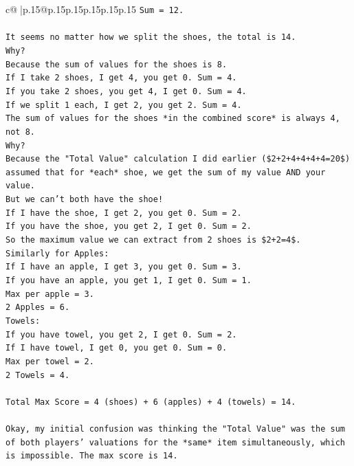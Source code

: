 \documentclass{article}
\begin{document}
{\begin{supertabular}{c@{$\;$}|p{.15\linewidth}@{}p{.15\linewidth}p{.15\linewidth}p{.15\linewidth}p{.15\linewidth}p{.15\linewidth}}
{{{\texttt{Sum = 12.} \\
\\ 
\texttt{It seems no matter how we split the shoes, the total is 14.} \\
\texttt{Why?} \\
\texttt{Because the sum of values for the shoes is 8.} \\
\texttt{If I take 2 shoes, I get 4, you get 0. Sum = 4.} \\
\texttt{If you take 2 shoes, you get 4, I get 0. Sum = 4.} \\
\texttt{If we split 1 each, I get 2, you get 2. Sum = 4.} \\
\texttt{The sum of values for the shoes *in the combined score* is always 4, not 8.} \\
\texttt{Why?} \\
\texttt{Because the "Total Value" calculation I did earlier (\$2+2+4+4+4+4=20\$) assumed that for *each* shoe, we get the sum of my value AND your value.} \\
\texttt{But we can't both have the shoe!} \\
\texttt{If I have the shoe, I get 2, you get 0. Sum = 2.} \\
\texttt{If you have the shoe, you get 2, I get 0. Sum = 2.} \\
\texttt{So the maximum value we can extract from 2 shoes is \$2+2=4\$.} \\
\texttt{Similarly for Apples:} \\
\texttt{If I have an apple, I get 3, you get 0. Sum = 3.} \\
\texttt{If you have an apple, you get 1, I get 0. Sum = 1.} \\
\texttt{Max per apple = 3.} \\
\texttt{2 Apples = 6.} \\
\texttt{Towels:} \\
\texttt{If you have towel, you get 2, I get 0. Sum = 2.} \\
\texttt{If I have towel, I get 0, you get 0. Sum = 0.} \\
\texttt{Max per towel = 2.} \\
\texttt{2 Towels = 4.} \\
\\ 
\texttt{Total Max Score = 4 (shoes) + 6 (apples) + 4 (towels) = 14.} \\
\\ 
\texttt{Okay, my initial confusion was thinking the "Total Value" was the sum of both players' valuations for the *same* item simultaneously, which is impossible. The max score is 14.} \\
}}}
\end{supertabular}}
\end{document}

